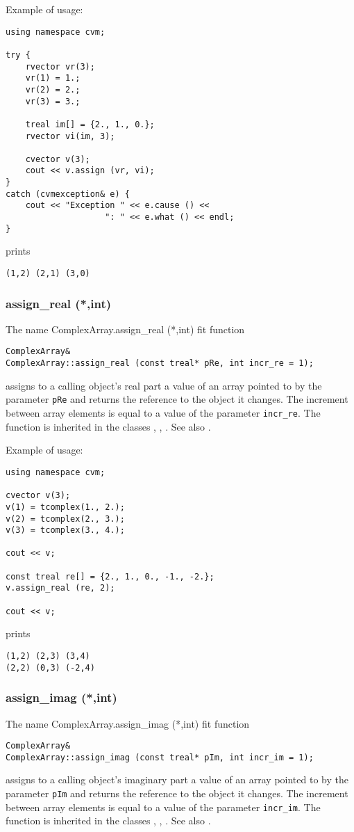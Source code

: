 Example of usage:
\begin{verbatim}
using namespace cvm;

try {
    rvector vr(3);
    vr(1) = 1.;
    vr(2) = 2.;
    vr(3) = 3.;

    treal im[] = {2., 1., 0.};
    rvector vi(im, 3);

    cvector v(3);
    cout << v.assign (vr, vi);
}
catch (cvmexception& e) {
    cout << "Exception " << e.cause () <<
                    ": " << e.what () << endl;
}
\end{verbatim}
prints
\begin{verbatim}
(1,2) (2,1) (3,0)
\end{verbatim}
\newpage




\subsubsection{assign\_real (*,int)}
The%
\pdfdest name {ComplexArray.assign_real (*,int)} fit{ }
function
\begin{verbatim}
ComplexArray&
ComplexArray::assign_real (const treal* pRe, int incr_re = 1);
\end{verbatim}
assigns to a calling object's real part
a value of an array pointed to by the parameter
\verb"pRe" and returns the reference to
the object it changes. The increment between array elements
is equal to a value of the parameter \verb"incr_re".
The function is inherited in the classes
,
,
.
See also .

Example of usage:
\begin{verbatim}
using namespace cvm;

cvector v(3);
v(1) = tcomplex(1., 2.);
v(2) = tcomplex(2., 3.);
v(3) = tcomplex(3., 4.);

cout << v;

const treal re[] = {2., 1., 0., -1., -2.};
v.assign_real (re, 2);

cout << v;
\end{verbatim}
prints
\begin{verbatim}
(1,2) (2,3) (3,4)
(2,2) (0,3) (-2,4)
\end{verbatim}
\newpage




\subsubsection{assign\_imag (*,int)}
The%
\pdfdest name {ComplexArray.assign_imag (*,int)} fit{ }
function
\begin{verbatim}
ComplexArray&
ComplexArray::assign_imag (const treal* pIm, int incr_im = 1);
\end{verbatim}
assigns to a calling object's imaginary part
a value of an array pointed to by the parameter
\verb"pIm" and returns the reference to
the object it changes. The increment between array elements
is equal to a value of the parameter \verb"incr_im".
The function is inherited in the classes
,
,
.
See also .

